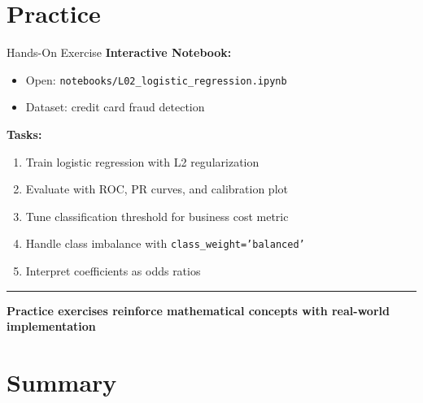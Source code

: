 \documentclass[8pt,aspectratio=169]{beamer}
\newcommand{\bottomnote}[1]{%
\vfill
\vspace{-2mm}
\textcolor{mllavender2}{\rule{\textwidth}{0.4pt}}
\vspace{1mm}
\footnotesize
\textbf{#1}
}
\begin{document}
\section{Practice}

\begin{frame}[t]{Hands-On Exercise}
\textbf{Interactive Notebook:}
\begin{itemize}
\item Open: \texttt{notebooks/L02\_logistic\_regression.ipynb}
\item Dataset: credit card fraud detection
\end{itemize}

\vspace{0.5em}
\textbf{Tasks:}
\begin{enumerate}
\item Train logistic regression with L2 regularization
\item Evaluate with ROC, PR curves, and calibration plot
\item Tune classification threshold for business cost metric
\item Handle class imbalance with \texttt{class\_weight='balanced'}
\item Interpret coefficients as odds ratios
\end{enumerate}
\bottomnote{Practice exercises reinforce mathematical concepts with real-world implementation}
\end{frame}

\section{Summary}
\end{document}

